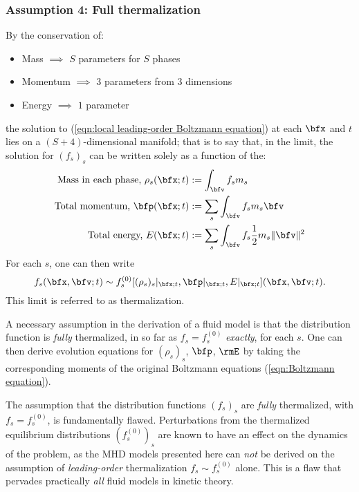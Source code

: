 \subsubsection*{Assumption 4: Full thermalization}
    By the conservation of:
    \begin{itemize}
        \item  Mass $\implies$ $S$ parameters for $S$ phases
        \item  Momentum $\implies$ $3$ parameters from $3$ dimensions
        \item  Energy $\implies$ $1$ parameter
    \end{itemize}
    the solution to (\ref{eqn:local leading-order Boltzmann equation}) at each $\bfx$ and $t$ lies on a $(S + 4)$-dimensional manifold; that is to say that, in the limit, the solution for $(f_{s})_{s}$ can be written solely as a function of the:
    \begin{align}
        \text{Mass in each phase, }  \rho_{s}(\bfx; t)  &:=  \int_{\bfv}f_{s}m_{s}  \\
        \text{Total momentum, }  \bfp(\bfx; t)  &:=  \sum_{s}\int_{\bfv}f_{s}m_{s}\bfv  \\
        \text{Total energy, }  E(\bfx; t)  &:=  \sum_{s}\int_{\bfv}f_{s}\frac{1}{2}m_{s}\|\bfv\|^{2}
    \end{align}
    For each $s$, one can then write
    \begin{equation}
        f_{s}(\bfx, \bfv; t)  \sim  f_{s}^{(0)}[(\rho_{s})_{s}|_{\bfx; t}, \bfp|_{\bfx; t}, E|_{\bfx; t}](\bfx, \bfv; t).
    \end{equation}
    This limit is referred to as thermalization.
    
    A necessary assumption in the derivation of a fluid model is that the distribution function is \emph{fully} thermalized, in so far as $f_{s}  =  f_{s}^{(0)}$ \emph{exactly}, for each $s$. One can then derive evolution equations for $(\rho_{s})_{s}$, $\bfp$, $\rmE$ by taking the corresponding moments of the original Boltzmann equations (\ref{eqn:Boltzmann equation}).

    \begin{remark}
        The assumption that the distribution functions $(f_{s})_{s}$ are \emph{fully} thermalized, with $f_{s}  =  f_{s}^{(0)}$, is fundamentally flawed. Perturbations from the thermalized equilibrium distributions $(f_{s}^{(0)})_{s}$ are known to have an effect on the dynamics of the problem, as the MHD models presented here can \emph{not} be derived on the assumption of \emph{leading-order} thermalization $f_{s}  \sim  f_{s}^{(0)}$ alone. \BA{[Ref]} This is a flaw that pervades practically \emph{all} fluid models in kinetic theory.
    \end{remark}

